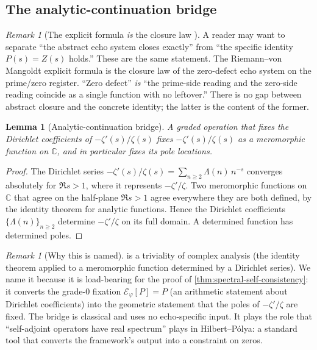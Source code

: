 \documentclass[11pt,a4paper]{article}
\theoremstyle{plain}
\newtheorem{lemma}[theorem]{Lemma}
\theoremstyle{definition}
\theoremstyle{remark}
\newtheorem{remark}[theorem]{Remark}
\numberwithin{equation}{section}
\providecommand{\C}{\mathbb{C}}
\providecommand{\vp}{\varphi}
\providecommand{\EF}{\mathcal{E}}
\begin{document}
\subsection{The analytic-continuation bridge}

\begin{remark}[The explicit formula \emph{is} the closure law
{\cite[Rmk.~7.4]{echo-rh}}]
\label{rmk:identity-is-closure}
A reader may want to separate ``the abstract echo system closes
exactly'' from ``the specific identity $P(s) = Z(s)$ holds.''
These are the same statement.  The Riemann--von Mangoldt explicit
formula is the closure law of the zero-defect echo system on the
prime/zero register.  ``Zero defect'' \emph{is} ``the prime-side
reading and the zero-side reading coincide as a single function
with no leftover.''  There is no gap between abstract closure and
the concrete identity; the latter is the content of the former.
\end{remark}

\begin{lemma}[Analytic-continuation bridge]
\label{lem:ac-bridge}
A graded operation that fixes the Dirichlet coefficients of
$-\zeta'(s)/\zeta(s)$ fixes $-\zeta'(s)/\zeta(s)$ as a meromorphic
function on $\mathbb{C}$, and in particular fixes its pole
locations.
\end{lemma}

\begin{proof}
The Dirichlet series
$-\zeta'(s)/\zeta(s) = \sum_{n \ge 2} \Lambda(n)\, n^{-s}$
converges absolutely for $\Re s > 1$, where it represents
$-\zeta'/\zeta$.  Two meromorphic functions on $\C$ that agree on
the half-plane $\Re s > 1$ agree everywhere they are both defined,
by the identity theorem for analytic functions.  Hence the
Dirichlet coefficients $\{\Lambda(n)\}_{n \ge 2}$ determine
$-\zeta'/\zeta$ on its full domain.  A determined function has
determined poles.
\end{proof}

\begin{remark}[Why this is named]
\label{rmk:ac-bridge-named}
 is a triviality of complex analysis (the
identity theorem applied to a meromorphic function determined by
a Dirichlet series).  We name it because it is load-bearing for
the proof of \cref{thm:spectral-self-consistency}: it converts
the grade-$0$ fixation $\EF_\vp[P] = P$ (an arithmetic statement
about Dirichlet coefficients) into the geometric statement that
the poles of $-\zeta'/\zeta$ are fixed.  The bridge is classical
and uses no echo-specific input.  It plays the role that
``self-adjoint operators have real spectrum'' plays in
Hilbert--P\'olya: a standard tool that converts the framework's
output into a constraint on zeros.
\end{remark}
\end{document}
